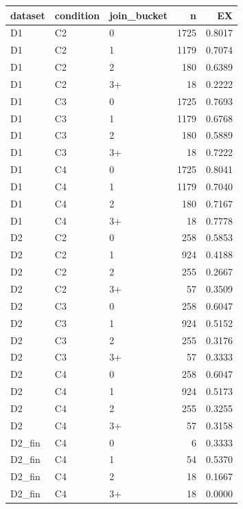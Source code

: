 \begin{tabular}{lllrr}
\toprule
dataset & condition & join\_bucket & n & EX \\
\midrule
D1 & C2 & 0 & 1725 & 0.8017 \\
D1 & C2 & 1 & 1179 & 0.7074 \\
D1 & C2 & 2 & 180 & 0.6389 \\
D1 & C2 & 3+ & 18 & 0.2222 \\
D1 & C3 & 0 & 1725 & 0.7693 \\
D1 & C3 & 1 & 1179 & 0.6768 \\
D1 & C3 & 2 & 180 & 0.5889 \\
D1 & C3 & 3+ & 18 & 0.7222 \\
D1 & C4 & 0 & 1725 & 0.8041 \\
D1 & C4 & 1 & 1179 & 0.7040 \\
D1 & C4 & 2 & 180 & 0.7167 \\
D1 & C4 & 3+ & 18 & 0.7778 \\
D2 & C2 & 0 & 258 & 0.5853 \\
D2 & C2 & 1 & 924 & 0.4188 \\
D2 & C2 & 2 & 255 & 0.2667 \\
D2 & C2 & 3+ & 57 & 0.3509 \\
D2 & C3 & 0 & 258 & 0.6047 \\
D2 & C3 & 1 & 924 & 0.5152 \\
D2 & C3 & 2 & 255 & 0.3176 \\
D2 & C3 & 3+ & 57 & 0.3333 \\
D2 & C4 & 0 & 258 & 0.6047 \\
D2 & C4 & 1 & 924 & 0.5173 \\
D2 & C4 & 2 & 255 & 0.3255 \\
D2 & C4 & 3+ & 57 & 0.3158 \\
D2\_fin & C4 & 0 & 6 & 0.3333 \\
D2\_fin & C4 & 1 & 54 & 0.5370 \\
D2\_fin & C4 & 2 & 18 & 0.1667 \\
D2\_fin & C4 & 3+ & 18 & 0.0000 \\
\bottomrule
\end{tabular}
